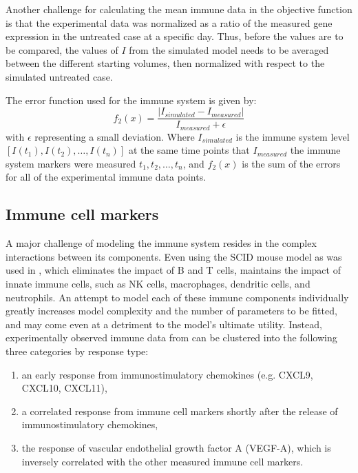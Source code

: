 Another challenge for calculating the mean immune data in the objective function is that the experimental data was normalized as a ratio of the measured gene expression in the untreated case at a specific day. Thus, before the values are to be compared, the values of $I$ from the simulated model needs to be averaged between the different starting volumes, then normalized with respect to the simulated untreated case.

The error function used for the immune system is given by:
\begin{equation}
	f_2(x) = \frac{|I_{simulated}-I_{measured}|}{I_{measured}+\epsilon}
\end{equation}
with $\epsilon$ representing a small deviation. Where $I_{simulated}$ is the immune system level $[I(t_1), I(t_2), \dots, I(t_n)]$ at the same time points that $I_{measured}$ the immune system markers were measured $t_1, t_2, \dots, t_n$, and  $f_2(x)$ is the sum of the errors for all of the experimental immune data points.


\subsection{Immune cell markers}
A major challenge of modeling the immune system resides in the complex interactions between its components. Even using the \ac{SCID} mouse model as was used in  \cite{wu2014metronomic}, which eliminates the impact of B and T cells, maintains the impact of innate immune cells, such as NK cells, macrophages, dendritic cells, and neutrophils. An attempt to model each of these immune components individually greatly increases  model complexity and the number of parameters to be fitted, and may come even at a detriment to the model's ultimate utility. Instead, experimentally observed immune data from \cite{wu2014metronomic} can be clustered into the following three categories by response type:
\begin{enumerate}
	\item an early response from immunostimulatory chemokines (e.g. CXCL9, CXCL10, CXCL11),
	\item a correlated response from immune cell markers shortly after the release of immunostimulatory chemokines,
	\item the response of vascular endothelial growth factor A (VEGF-A), which is inversely correlated with the other measured immune cell markers.
\end{enumerate}

